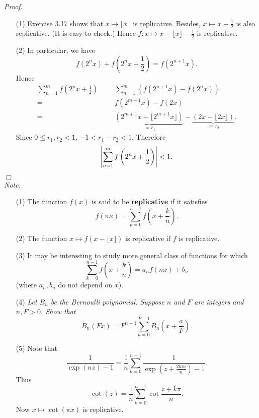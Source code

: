 \documentclass{article}
\begin{document}
\emph{Proof.}
\begin{enumerate}
\item[(1)]
  Exercise 3.17 shows that $x \mapsto \lfloor x \rfloor$ is replicative.
  Besides, $x \mapsto x - \frac{1}{2}$ is also replicative. (It is easy to check.)
  Hence $f: x \mapsto x - \lfloor x \rfloor - \frac{1}{2}$ is replicative.

\item[(2)]
  In particular, we have
  \[
    f\left( 2^n x \right) + f\left( 2^n x + \frac{1}{2} \right)
    = f\left( 2^{n+1} x \right).
  \]
  Hence
  \begin{align*}
    \sum_{n=1}^{m} f\left( 2^n x + \frac{1}{2} \right)
    =& \:
    \sum_{n=1}^{m} \left\{f(2^{n+1} x) - f(2^n x) \right\} \\
    =& \:
    f(2^{m+1} x) - f(2x) \\
    =& \:
    \underbrace{(2^{m+1}x - \lfloor 2^{m+1}x \rfloor)}_{:= r_1}
        - \underbrace{(2x - \lfloor 2x \rfloor)}_{:= r_2}.
  \end{align*}
  Since $0 \leq r_1, r_2 < 1$, $-1 < r_1 - r_2 < 1$.
  Therefore
  \[
    \abs{ \sum_{n=1}^{m} f\left( 2^n x + \frac{1}{2} \right) } < 1.
  \]
\end{enumerate}
$\Box$ \\



\emph{Note.}
\begin{enumerate}
\item[(1)]
  The function $f(x)$ is said to be \textbf{replicative} if it satisfies
  \[
    f(nx) = \sum_{k=0}^{n-1} f\left( x+\frac{k}{n} \right).
  \]

\item[(2)]
  The function $x \mapsto f(x - \lfloor x \rfloor)$ is replicative if $f$ is replicative.

\item[(3)]
  It may be interesting to study more general class of functions for which
  \[
    \sum_{k=0}^{n-1} f\left( x+\frac{k}{n} \right) = a_n f(nx) + b_n
  \]
  (where $a_n, b_n$ do not depend on $x$).

\item[(4)]
  \emph{Let $B_n$ be the Bernoulli polynomial.
  Suppose $n$ and $F$ are integers and $n, F > 0$. Show that}
  \[
    B_n(Fx) = F^{n-1} \sum_{a=0}^{F-1} B_n \left(x + \frac{a}{F} \right).
  \]

\item[(5)]
  Note that
  \[
    \frac{1}{\exp(nz) - 1}
    = \frac{1}{n} \sum_{k=0}^{n-1} \frac{1}{\exp(z + \frac{2 k \pi i}{n}) - 1}.
  \]
  Thus
  \[
    \cot(z) = \frac{1}{n} \sum_{k=0}^{n-1} \cot\frac{z + k\pi}{n}.
  \]
  Now $x \mapsto \cot(\pi x)$ is replicative. \\\\
\end{enumerate}
\end{document}
